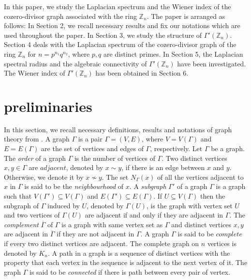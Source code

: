 \documentclass{amsart}
\theoremstyle{plain}
\theoremstyle{definition}
\theoremstyle{remark}
\begin{document}
In this paper, we study the Laplacian spectrum and the Wiener index of the cozero-divisor graph associated with the ring $\mathbb{Z}_n$. The paper is arranged as follows: In Section 2, we recall necessary results and fix our notations which are used throughout the paper. In Section 3, we study the structure of $\Gamma'(\mathbb{Z}_n)$. Section 4 deals with the Laplacian spectrum of the cozero-divisor graph of the ring $\mathbb{Z}_n$ for $n = p^{n_1}q^{n_2}$, where $p, q$ are distinct primes. In Section 5, the Laplacian spectral radius and the algebraic connectivity of $\Gamma'(\mathbb{Z}_n)$ have been investigated. The Wiener index of $\Gamma'(\mathbb{Z}_n)$ has been obtained in Section 6.


\section{preliminaries}
In this section, we recall  necessary definitions, results and notations of graph theory from \cite{westgraph}.
A graph $\Gamma$ is a pair  $ \Gamma = (V, E)$, where $V = V(\Gamma)$ and $E = E(\Gamma)$ are the set of vertices and edges of $\Gamma$, respectively. Let $\Gamma$ be a graph. The \emph{order} of a graph $\Gamma$ is the number of vertices of $\Gamma$. 
 Two distinct vertices $x, y \in \Gamma$ are $\mathit{adjacent}$, denoted by $x \sim y$, if there is an edge between $x$ and $y$. Otherwise, we denote it by $x \nsim y$.   
 The set $N_{\Gamma}(x)$ of all the vertices adjacent to $x$ in $\Gamma$ is said to be the \emph{neighbourhood} of $x$. %
 A \emph{subgraph} $\Gamma'$ of a graph $\Gamma$ is a graph such that $V(\Gamma') \subseteq V(\Gamma)$ and $E(\Gamma') \subseteq E(\Gamma)$. If $U \subseteq V(\Gamma)$ then the subgraph of $\Gamma$ induced by $U$, denoted by $\Gamma(U)$, is the graph with vertex set $U$ and two vertices of $\Gamma(U)$ are adjacent if and only if they are adjacent in $\Gamma$. The \emph{complement} $\overline{\Gamma}$ of $\Gamma$ is a graph with same vertex set as $\Gamma$ and distinct vertices $x, y$ are adjacent in $\overline{\Gamma}$ if they are not adjacent in $\Gamma$. A graph $\Gamma$ is said to be $complete$ if every two distinct vertices are adjacent. The complete graph on $n$ vertices is denoted by $K_n$. A path in a graph is a sequence of distinct vertices with the property that each vertex in the sequence is adjacent to the next vertex of it. The graph $\Gamma$ is said to be \emph{connected} if there is path between every pair of vertex.
 
\end{document}
